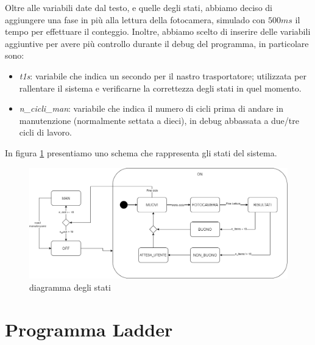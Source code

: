 \documentclass{article}
\begin{document}
Oltre alle variabili date dal testo, e quelle degli stati, abbiamo deciso di aggiungere una fase in più alla lettura della fotocamera, simulado con $500ms$ il tempo per effettuare il conteggio.
Inoltre, abbiamo scelto di inserire delle variabili aggiuntive per avere più controllo durante il debug del programma, in particolare sono:
\begin{itemize}
    \item \textit{t1s}: variabile che indica un secondo per il nastro trasportatore; utilizzata per rallentare il sistema e verificarne la correttezza degli stati in quel momento.
    \item \textit{n\_cicli\_man}: variabile che indica il numero di cicli prima di andare in manutenzione (normalmente settata a dieci), in debug abbassata a due/tre cicli di lavoro.
\end{itemize}

In figura \ref*{fig:schema} presentiamo uno schema che rappresenta gli stati del sistema.
\begin{figure}[H]
    \centering
    \includegraphics[width = 1\linewidth]{Diagramma_Stati.png}
    \caption{diagramma degli stati}
    \label{fig:schema}
\end{figure}


\section{Programma Ladder}

\end{document}
